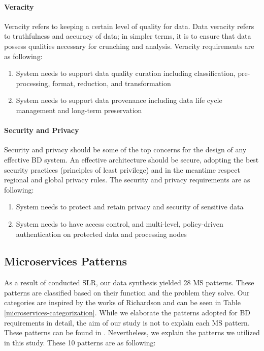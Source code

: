 \documentclass{bmcart}
\begin{document}
\paragraph{Veracity}

Veracity refers to keeping a certain level of quality for data. Data veracity refers to truthfulness and accuracy of data; in simpler terms, it is to ensure that data possess qualities necessary for crunching and analysis. Veracity requirements are as following: 

\begin{enumerate}[label=\textbf{Ver-\arabic*}]
    \item System needs to support data quality curation including classification, pre-processing, format, reduction, and transformation
    \item System needs to support data provenance including data life cycle management and long-term preservation
\end{enumerate}


\paragraph{Security and Privacy}

Security and privacy should be some of the top concerns for the design of any effective BD system. An effective architecture should be secure, adopting the best security practices (principles of least privilege) and in the meantime respect regional and global privacy rules. The security and privacy requirements are as following:

\begin{enumerate}[label=\textbf{SaP-\arabic*}]
    \item System needs to protect and retain privacy and security of sensitive data
    \item System needs to have access control, and multi-level, policy-driven authentication on protected data and processing nodes
\end{enumerate}


\subsection{Microservices Patterns}



As a result of conducted SLR, our data synthesis yielded 28 MS patterns. These patterns are classified based on their function and the problem they solve. Our categories are inspired by the works of Richardson \cite{Richardson.2022} and can be seen in Table \ref{microservices-categorization}. While we elaborate the patterns adopted for BD requirements in detail, the aim of our study is not to explain each MS pattern. These patterns can be found in \cite{richardson2018microservices}. Nevertheless, we explain the patterns we utilized in this study. These 10 patterns are as following: 
\end{document}
